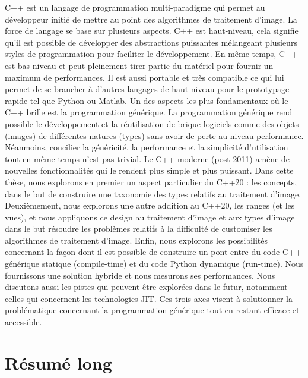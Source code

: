 \documentclass[11pt,a4paper]{book}
\begin{document}
\noindent C++ est un langage de programmation multi-paradigme qui permet au développeur initié de mettre au point des
algorithmes de traitement d'image. La force de langage se base sur plusieurs aspects. C++ est haut-niveau, cela signifie
qu'il est possible de développer des abstractions puissantes mélangeant plusieurs styles de programmation pour faciliter
le développement. En même temps, C++ est bas-niveau et peut pleinement tirer partie du matériel pour fournir un maximum
de performances. Il est aussi portable et très compatible ce qui lui permet de se brancher à d'autres langages de haut
niveau pour le prototypage rapide tel que Python ou Matlab. Un des aspects les plus fondamentaux où le C++ brille est la
programmation générique. La programmation générique rend possible le développement et la réutilisation de brique
logiciels comme des objets (images) de différentes natures (types) sans avoir de perte au niveau performance. Néanmoins,
concilier la généricité, la performance et la simplicité d'utilisation tout en même temps n'est pas trivial. Le C++
moderne (post-2011) amène de nouvelles fonctionnalités qui le rendent plus simple et plus puissant. Dans cette thèse,
nous explorons en premier un aspect particulier du C++20 : les concepts, dans le but de construire une taxonomie des
types relatifs au traitement d'image. Deuxièmement, nous explorons une autre addition au C++20, les ranges (et les
vues), et nous appliquons ce design au traitement d'image et aux types d'image dans le but résoudre les problèmes
relatifs à la difficulté de customiser les algorithmes de traitement d'image. Enfin, nous explorons les possibilités
concernant la façon dont il est possible de construire un pont entre du code C++ générique statique (compile-time) et du
code Python dynamique (run-time). Nous fournissons une solution hybride et nous mesurons ses performances. Nous
discutons aussi les pistes qui peuvent être explorées dans le futur, notamment celles qui concernent les technologies
JIT. Ces trois axes visent à solutionner la problématique concernant la programmation générique tout en restant efficace
et accessible.

\chapter*{Résumé long}
\label{sec:long_summary}


\tableofcontents
\label{table.of.contents}

\listoffigures
\label{list.of.figures}
\end{document}
